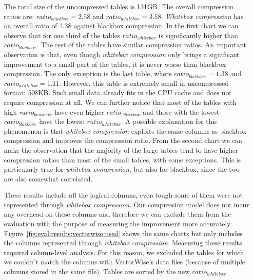 The total size of the uncompressed tables is 131GB. The overall compression ratios are:  \(ratio_{blackbox} = 2.58\) and \(ratio_{whitebox} = 3.58\). \textit{Whitebox compression} has an overall ratio of 1.38 against blackbox compression. In the first chart we can observe that for one third of the tables \(ratio_{whitebox}\) is significantly higher than \(ratio_{blackbox}\). The rest of the tables have similar compression ratios. 
An important observation is that, even though \textit{whitebox compression} only brings a significant improvement to a small part of the tables, it is never worse than blackbox compression. The only exception is the last table, where \(ratio_{blackbox} = 1.38\) and \(ratio_{whitebox} = 1.11\). However, this table is extremely small in uncompressed format: 508KB. Such small data already fits in the CPU cache and does not require compression at all. We can further notice that most of the tables with high \(ratio_{blackbox}\) have even higher \(ratio_{whitebox}\) and those with the lowest \(ratio_{blackbox}\) have the lowest \(ratio_{whitebox}\). A possible explanation for this phenomenon is that \textit{whitebox compression} exploits the same columns as blackbox compression and improves the compression ratio. From the second chart we can make the observation that the majority of the large tables tend to have higher compression ratios than most of the small tables, with some exceptions. This is particularly true for \textit{whitebox compression}, but also for blackbox, since the two are also somewhat correlated.

These results include all the logical columns, even tough some of them were not represented through \textit{whitebox compression}. Our compression model does not incur any overhead on these columns and therefore we can exclude them from the evaluation with the purpose of measuring the improvement more accurately. Figure~\ref{fig:eval:results:vectorwise:used} shows the same charts but only includes the columns represented through \textit{whitebox compression}. Measuring these results required column-level analysis. For this reason, we excluded the tables for which we couldn't match the columns with VectorWise's data files (because of multiple columns stored in the same file). Tables are sorted by the new \(ratio_{whitebox}\).

